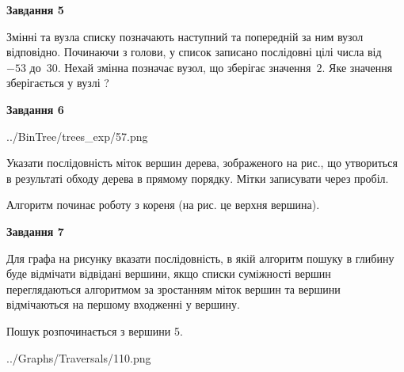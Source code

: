 \documentclass[12pt, ukrainian]{article}
\begin{document}
{\begin {large}
{\begin {center}\textbf{Завдання 5}\end {center}}\par
Змінні  та  вузла списку позначають наступний та попередній за ним вузол відповідно. Починаючи з голови, у список записано послідовні цілі числа від~$-53$ до~$30$. Нехай змінна  позначає вузол, що зберігає значення~$2$.
Яке значення зберігається у вузлі  ?\par
\newpage

{\begin {center}\textbf{Завдання 6}\end {center}}\par

\begin{center}
	{../BinTree/trees_exp/57.png}
\end{center}
Указати послідовність міток вершин дерева, зображеного на рис., що утвориться в результаті обходу дерева в прямому порядку. Мітки записувати через пробіл.\par Алгоритм починає роботу з кореня (на рис. це верхня вершина).\par
\newpage

{\begin {center}\textbf{Завдання 7}\end {center}}\par
Для графа на рисунку вказати послідовність, в якій алгоритм пошуку в глибину буде відмічати відвідані вершини, якщо списки суміжності вершин переглядаються алгоритмом за зростанням міток вершин та вершини відмічаються на першому вход\-женні у вершину.\par
Пошук розпочинається з вершини 5.\par

\begin{center}
	{../Graphs/Traversals/110.png}
\end{center}\par
\newpage


\end{large}}
\end{document}
